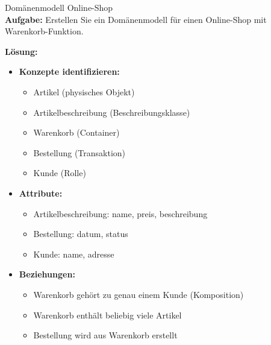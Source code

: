 \begin{example2}{Domänenmodell Online-Shop}\\
\textbf{Aufgabe:} Erstellen Sie ein Domänenmodell für einen Online-Shop mit Warenkorb-Funktion.

\textbf{Lösung:}
\begin{itemize}
    \item \textbf{Konzepte identifizieren:}
    \begin{itemize}
        \item Artikel (physisches Objekt)
        \item Artikelbeschreibung (Beschreibungsklasse)
        \item Warenkorb (Container)
        \item Bestellung (Transaktion)
        \item Kunde (Rolle)
    \end{itemize}
    \item \textbf{Attribute:}
    \begin{itemize}
        \item Artikelbeschreibung: name, preis, beschreibung
        \item Bestellung: datum, status
        \item Kunde: name, adresse
    \end{itemize}
    \item \textbf{Beziehungen:}
    \begin{itemize}
        \item Warenkorb gehört zu genau einem Kunde (Komposition)
        \item Warenkorb enthält beliebig viele Artikel
        \item Bestellung wird aus Warenkorb erstellt
    \end{itemize}
\end{itemize}
\end{example2}

